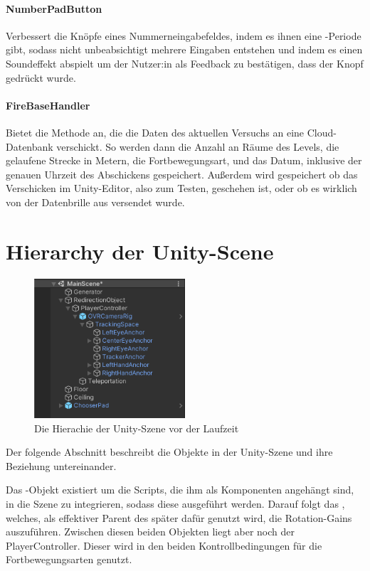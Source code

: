 \begin{multicols*}{2}
    \paragraph{NumberPadButton}
    Verbessert die Knöpfe eines Nummerneingabefeldes, indem es ihnen eine -Periode gibt, sodass nicht unbeabsichtigt mehrere Eingaben entstehen und indem es einen Soundeffekt abspielt um der Nutzer:in als Feedback zu bestätigen, dass der Knopf gedrückt wurde.

    \paragraph{FireBaseHandler}
    Bietet die Methode  an, die die Daten des aktuellen Versuchs an eine Cloud-Datenbank verschickt. So werden dann die Anzahl an Räume des Levels, die gelaufene Strecke in Metern, die Fortbewegungsart, und das Datum, inklusive der genauen Uhrzeit des Abschickens gespeichert. Außerdem wird gespeichert ob das Verschicken im Unity-Editor, also zum Testen, geschehen ist, oder ob es wirklich von der Datenbrille aus versendet wurde.
\end{multicols*}

\section{Hierarchy der Unity-Scene}\label{sec:hierarchy}

\begin{figure}[!h]
    \centering
    \includegraphics[width=0.5\textwidth]{images/hierarchy.png}
    \caption{Die Hierachie der Unity-Szene vor der Laufzeit}\label{figure:hierarchy}
\end{figure}

Der folgende Abschnitt beschreibt die Objekte in der Unity-Szene und ihre Beziehung untereinander.

Das -Objekt existiert um die Scripts, die ihm als Komponenten angehängt sind, in die Szene zu integrieren, sodass diese ausgeführt werden. Darauf folgt das , welches, als effektiver Parent des  später dafür genutzt wird, die Rotation-Gains auszuführen. Zwischen diesen beiden Objekten liegt aber noch der PlayerController. Dieser wird in den beiden Kontrollbedingungen für die Fortbewegungsarten genutzt.

